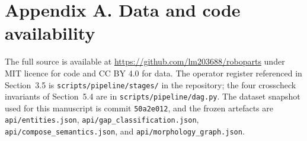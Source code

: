 \section*{Appendix A. Data and code availability}

The full source is available at
\url{https://github.com/lm203688/roboparts} under MIT licence for
code and CC BY 4.0 for data. The operator register referenced in
Section~3.5 is \texttt{scripts/pipeline/stages/} in the repository;
the four crosscheck invariants of Section~5.4 are in
\texttt{scripts/pipeline/dag.py}. The dataset snapshot used for
this manuscript is commit \texttt{50a2e012}, and the frozen
artefacts are \texttt{api/entities.json},
\texttt{api/gap\_classification.json},
\texttt{api/compose\_semantics.json}, and
\texttt{api/morphology\_graph.json}.

